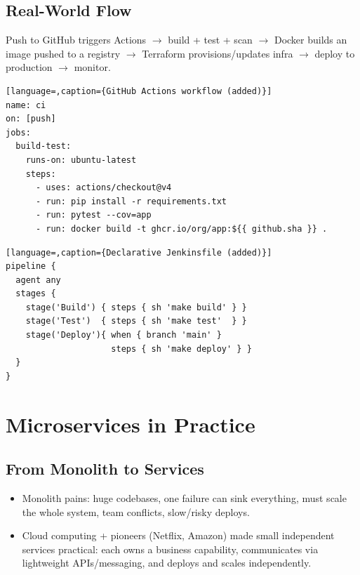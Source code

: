 \documentclass[hidelinks]{article}
\begin{document}
\subsection{Real-World Flow}
Push to GitHub triggers Actions $\to$ build + test + scan $\to$ Docker builds an image pushed to a
registry $\to$ Terraform provisions/updates infra $\to$ deploy to production $\to$ monitor.

\begin{lstlisting}[language=,caption={GitHub Actions workflow (added)}]
name: ci
on: [push]
jobs:
  build-test:
    runs-on: ubuntu-latest
    steps:
      - uses: actions/checkout@v4
      - run: pip install -r requirements.txt
      - run: pytest --cov=app
      - run: docker build -t ghcr.io/org/app:${{ github.sha }} .
\end{lstlisting}

\begin{lstlisting}[language=,caption={Declarative Jenkinsfile (added)}]
pipeline {
  agent any
  stages {
    stage('Build') { steps { sh 'make build' } }
    stage('Test')  { steps { sh 'make test'  } }
    stage('Deploy'){ when { branch 'main' }
                     steps { sh 'make deploy' } }
  }
}
\end{lstlisting}

\section{Microservices in Practice}

\subsection{From Monolith to Services}
\begin{itemize}
  \item Monolith pains: huge codebases, one failure can sink everything, must scale the whole
        system, team conflicts, slow/risky deploys.
  \item Cloud computing + pioneers (Netflix, Amazon) made small independent services practical:
        each owns a business capability, communicates via lightweight APIs/messaging, and deploys
        and scales independently.
\end{itemize}
\end{document}
